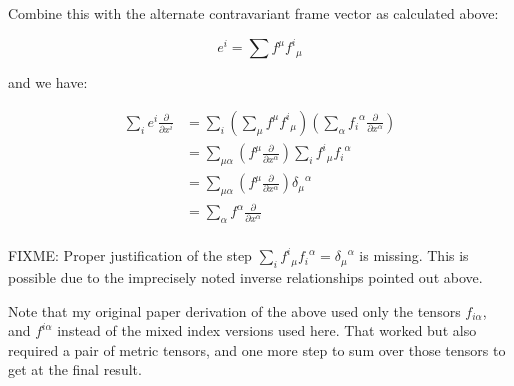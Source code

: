 \documentclass{article}      %
\begin{document}
Combine this with the alternate contravariant frame vector as calculated above:

\[
e^i = \sum f^{\mu} {f^i}_{\mu}
\]

and we have:

\begin{align*}
\sum_i e^i \frac{\partial}{\partial x^i}
&= \sum_i \left(\sum_{\mu} f^{\mu} {f^i}_{\mu} \right) \left( \sum_{\alpha} {f_i}^{\alpha} \frac{\partial}{\partial x^\alpha}\right) \\
&= \sum_{\mu \alpha} \left(f^{\mu} \frac{\partial}{\partial x^\alpha} \right) \sum_i {f^i}_{\mu} {f_i}^{\alpha} \\
&= \sum_{\mu \alpha} \left(f^{\mu} \frac{\partial}{\partial x^\alpha} \right) {\delta_{\mu}}^{\alpha} \\
&= \sum_{\alpha} f^{\alpha} \frac{\partial}{\partial x^\alpha} \\
\end{align*}

FIXME: Proper justification of the step $\sum_i {f^i}_{\mu} {f_i}^{\alpha} = {\delta_{\mu}}^{\alpha}$ is missing.  This is possible due
to the imprecisely noted inverse relationships pointed out above.

Note that my original paper derivation of the above used only the tensors $f_{i\alpha}$, and $f^{i\alpha}$ instead of the mixed index versions used here.  That worked but also required a pair of metric tensors, and one more step to sum over those tensors to get at the final result.
\end{document}

